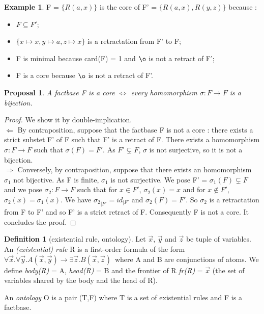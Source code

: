 \documentclass{article}
\theoremstyle{proposal}
\newtheorem{proposal}{Proposal}[section]
\theoremstyle{definition}
\newtheorem{definition}{Definition}[section]
\theoremstyle{theorem}
\theoremstyle{example}
\newtheorem{example}{Example}[section]
\theoremstyle{remark}
\begin{document}
\begin{example}
F = $\{R(a,x)\}$ is the core of F' = $\{R(a,x),R(y,z)\}$ because : 
\begin{itemize}
\item $F \subseteq F'$;
\item $\{x \mapsto x, y \mapsto a, z \mapsto x\}$ is a retractation from F' to F;
\item F is minimal because card(F) = 1 and $\o$ is not a retract of F';
\item F is a core because $\o$ is not a retract of F'.
\end{itemize}
\end{example}



\begin{proposal}
A factbase F is a core $\Leftrightarrow$ every homomorphism $\sigma: F \to F$ is a bijection.
\end{proposal}

\begin{proof}
We show it by double-implication. \\
$\boxed{\Leftarrow}$ By contraposition, suppose that the factbase F is not a core : there exists a strict substet F' of F such that F' is a retract of F. There exists a homomorphism $\sigma:F \to F$ such that $\sigma(F) = F'$. As $F' \subsetneq F$, $\sigma$ is not surjective, so it is not a bijection. \\
$\boxed{\Rightarrow}$ Conversely, by contraposition, suppose that there exists an homomorphism $\sigma_1$ not bijective. As F is finite, $\sigma_1$ is not surjective. We pose F' = $\sigma_1(F)\subsetneq F$ and we pose $\sigma_2:F \to F$ such that for $x \in F'$, $\sigma_2(x) = x$ and for $x \notin F'$, $\sigma_2(x) = \sigma_1(x)$. We have ${\sigma_2}_{|F'} = id_{|F'}$ and $\sigma_2(F) = F'$. So $\sigma_2$ is a retractation from F to F' and so F' is a strict retract of F. Consequently F is not a core. It concludes the proof.
\end{proof}


\begin{definition}[existential rule, ontology]
Let $\vec x$, $\vec y$ and $\vec z$ be tuple of variables. An \emph{(existential) rule} R is a first-order formula	 of the form  $\forall \vec x.\forall \vec y. A(\vec x,\vec y) \rightarrow \exists \vec z. B(\vec x,\vec z)$\ where  A and B are conjunctions of atoms. We define \emph{body(R)} = A, \emph{head(R)} = B and the frontier of R \emph{fr(R)} = $\vec x$ (the set of variables shared by the body and the head of R). 

An \emph{ontology} O is a pair (T,F) where T is a set of existential rules and F is a factbase.
\end{definition}
\end{document}
